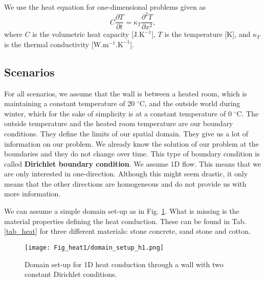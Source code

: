 We use the heat equation for one-dimensional problems given as
\begin{equation}
C\frac{\partial T}{\partial t} =\kappa_T\frac{\partial^2 T}{\partial x^2},
\end{equation}
where $C$ is the volumetric heat capacity [$\mathrm{J.K^{-1}}$], $T$ is the temperature [K], and $\kappa_T$ is the thermal conductivity [$\mathrm{W.m^{-1}.K^{-1}}$]. 


\newpage
\subsection{Scenarios}

For all scenarios, we assume that the wall is between a heated room, which is maintaining a constant temperature of 20 $^{\circ}$C, and the outside world during winter, which for the sake of simplicity is at a constant temperature of 0 $^{\circ}$C.
The outside temperature and the heated room temperature are our boundary conditions. They define the limits of our spatial domain. They give us a lot of information on our problem. We already know the solution of our problem at the boundaries and they do not change over time. This type of boundary condition is called \textbf{Dirichlet boundary condition}. 
We assume 1D flow. This means that we are only interested in one-direction. Although this might seem drastic, it only means that the other directions are homogeneous and do not provide us with more information.

We can assume a simple domain set-up as in Fig. \ref{dsuh1}. What is missing is the material properties defining the heat conduction. These can be found in Tab. \ref{tab_heat} for three different materials: stone concrete, sand stone and cotton.

\begin{figure}[!h]
	\centering
	\texttt{[image: Fig\_heat1/domain\_setup\_h1.png]}
	\caption{\label{dsuh1} Domain set-up for 1D heat conduction through a wall with two constant Dirichlet conditions.}
\end{figure} 

\begin{table}[!h]\caption{\label{tab_heat}Material properties needed for scenarios.}
	\centering
{}
\end{table}



